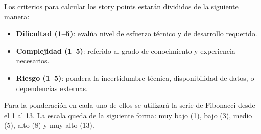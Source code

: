 \documentclass[
11pt, %
]{charter}
\begin{document}
Los criterios para calcular los story points estarán divididos de la siguiente manera:
\begin{itemize}
	\item \textbf{Dificultad (1–5)}: evalúa nivel de esfuerzo técnico y de desarrollo requerido.
	\item \textbf{Complejidad (1–5)}: referido al grado de conocimiento y experiencia necesarios.
	\item \textbf{Riesgo (1–5)}: pondera la incertidumbre técnica, disponibilidad de datos, o dependencias externas.
\end{itemize}

Para la ponderación en cada uno de ellos se utilizará la serie de Fibonacci desde el 1 al 13. La escala queda de la siguiente forma: muy bajo (1), bajo (3), medio (5), alto (8) y muy alto (13).
\end{document}
